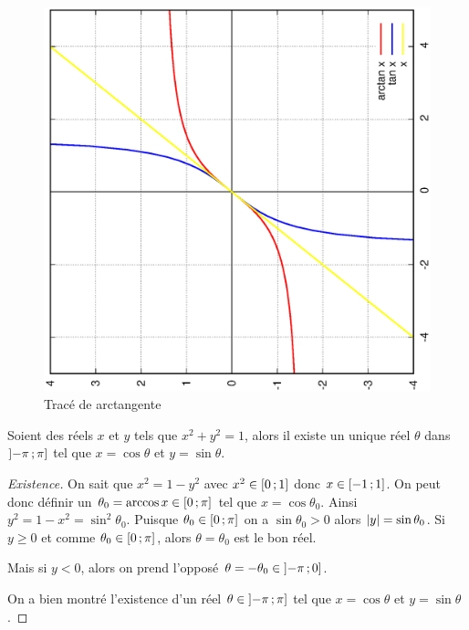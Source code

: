 \begin{figure}
  \centering
  \includegraphics[scale=0.4,angle=-90]{arctan.ps}
  \caption{Tracé de arctangente}
  \label{fig:tracearctangente}
\end{figure}
%
\begin{theo}
  \label{chap1-theo:thetasin}
  Soient des réels $x$ et $y$ tels que $x^2+y^2=1$, alors il existe un unique réel $\theta$ dans $\left] -\pi \, ;  \pi \right]$ tel que $x=\cos \theta$ et $y=\sin \theta$.
\end{theo}
\begin{proof}[Existence]
  On sait que $x^2=1-y^2$ avec $x^2 \in \left[ 0 \, ;  1 \right]$ donc $x \in \left[ -1 \, ;  1 \right]$. On peut donc définir un $\theta_0=\arccos x \in \left[ 0 \, ;  \pi \right]$ tel que $x=\cos \theta_0$. Ainsi $y^2=1-x^2=\sin^2 \theta_0$. Puisque $\theta_0 \in \left[ 0 \, ;  \pi \right]$ on a $\sin \theta_0>0$ alors $\left\lvert y\right\rvert=\sin \theta_0$.
Si $y \geq 0$ et comme $\theta_0 \in \left[ 0 \, ;  \pi \right]$, alors $\theta=\theta_0$ est le bon réel.

Mais si $y<0$, alors on prend l'opposé $\theta=-\theta_0 \in \left] -\pi \, ;  0 \right]$.

On a bien montré l'existence d'un réel $\theta \in \left] -\pi \, ;  \pi \right]$ tel que $x=\cos \theta$ et $y=\sin \theta$.
\end{proof}
